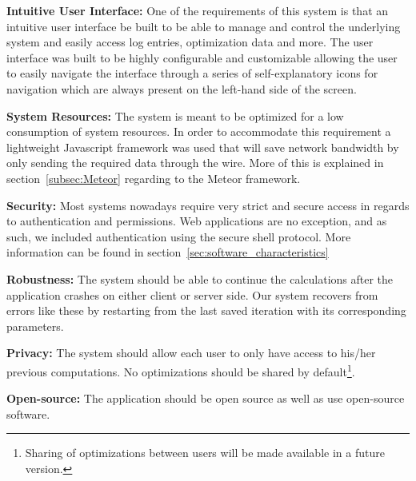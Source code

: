 \documentclass{article}
\begin{document}
\par
\textbf{Intuitive User Interface:}
One of the requirements of this system is that an intuitive user interface be built to be able to manage and control the underlying system and easily access log entries, optimization data and more. The user interface was built to be highly configurable and customizable allowing the user to easily navigate the interface through a series of self-explanatory icons for navigation which are always present on the left-hand side of the screen.\\\par

\noindent\textbf{System Resources:}
The system is meant to be optimized for a low consumption of system resources. In order to accommodate this requirement a lightweight Javascript framework was used that will save network bandwidth by only sending the required data through the wire. More of this is explained in section~\ref{subsec:Meteor} regarding to the Meteor framework.\\\par

\noindent\textbf{Security:}
Most systems nowadays require very strict and secure access in regards to authentication and permissions. Web applications are no exception, and as such, we included authentication using the secure shell protocol. More information can be found in section~\ref{sec:software_characteristics} \\\par

\noindent\textbf{Robustness:}
 The system should be able to continue the calculations after the application crashes on either client or server side. Our system recovers from errors like these by restarting from the last saved iteration with its corresponding parameters.\\\par

\noindent\textbf{Privacy:}
The system should allow each user to only have access to his/her previous computations. No optimizations should be shared by default\footnote{Sharing of optimizations between users will be made available in a future version.}.
 \\\par

\noindent\textbf{Open-source:}
The application should be open source as well as use open-source software.
\\\par
\end{document}
